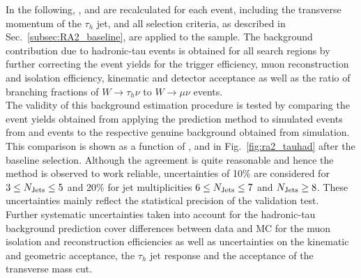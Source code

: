 In the following, \HT, \MHT and \NJets are recalculated for each event, including the transverse momentum of the $\tau_h$ jet, and all selection criteria, as described in Sec.~\ref{subsec:RA2_baseline}, are applied to the sample. The background contribution due to hadronic-tau events is obtained for all search regions by further correcting the event yields for the trigger efficiency, muon reconstruction and isolation efficiency, kinematic and detector acceptance as well as the ratio of branching fractions of $W \rightarrow \tau_h \nu$ to $W \rightarrow \mu \nu$ events.  \\
The validity of this background estimation procedure is tested by comparing the event yields obtained from applying the prediction method to simulated events from \ttbar and \WJets events to the respective genuine background obtained from simulation. This comparison is shown as a function of \HT, \MHT and \NJets in Fig.~\ref{fig:ra2_tauhad} after the baseline selection. Although the agreement is quite reasonable and hence the method is observed to work reliable, uncertainties of 10\% are considered for $3 \leq N_{\text{Jets}} \leq 5$ and 20\% for jet multiplicities $6 \leq N_{\text{Jets}} \leq 7$ and $N_{\text{Jets}} \ge 8$. These uncertainties mainly reflect the statistical precision of the validation test. \\
Further systematic uncertainties taken into account for the hadronic-tau background prediction cover differences between data and MC for the muon isolation and reconstruction efficiencies as well as uncertainties on the kinematic and geometric acceptance, the $\tau_h$ jet response and the acceptance of the transverse mass cut. 

